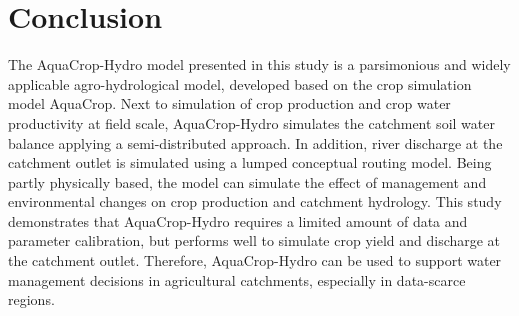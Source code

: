 \section{Conclusion}
The AquaCrop-Hydro model presented in this study is a parsimonious and widely applicable agro-hydrological model, developed based on the crop simulation model AquaCrop. Next to simulation of crop production and crop water productivity at field scale, AquaCrop-Hydro simulates the catchment soil water balance applying a semi-distributed approach. In addition, river discharge at the catchment outlet is simulated using a lumped conceptual routing model. Being partly physically based, the model can simulate the effect of management and environmental changes on crop production and catchment hydrology. This study demonstrates that AquaCrop-Hydro requires a limited amount of data and parameter calibration, but performs well to simulate crop yield and discharge at the catchment outlet. Therefore, AquaCrop-Hydro can be used to support water management decisions in agricultural catchments, especially in data-scarce regions.


\cleardoublepage